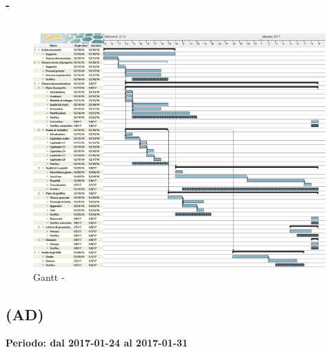 \documentclass[./PianoDiProgetto.tex]{subfiles}
\begin{document}
  \subsubsection{ - \PerAR}
    \begin{figure}[!h]
    \centering
    \includegraphics[width=\textwidth]{images/AR}
    \caption{Gantt - \PerAR}
    \end{figure}

	\subsection{\PerAD{} (AD)}
  \textbf{Periodo: dal 2017-01-24 al 2017-01-31}
\end{document}
